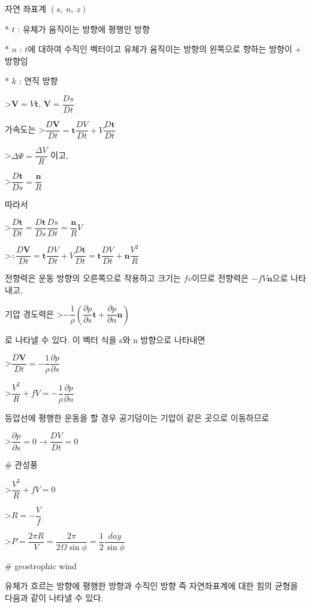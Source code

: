 자연 좌표계 $ (s,~n,~z)$ 

* $ t $ : 유체가 움직이는 방향에 평행인 방향

* $ n $ : $ t $에 대하여 수직인 벡터이고 유체가 움직이는 방향의 왼쪽으로 향하는 방향이 + 방향임

* $ k $ : 연직 방향

>$\mathbf{V} = V \mathbf{t}$, $\mathbf{V} = \dfrac{Ds}{Dt}$

가속도는
>$ \dfrac{D\mathbf{V}}{Dt} = \mathbf{t} \dfrac{DV}{Dt} + V \dfrac{D \mathbf{t}}{Dt}$

>$ \Delta \Psi = \dfrac{\Delta V}{R}$ 이고, 

>$ \dfrac{D \mathbf{t}}{Ds} = \dfrac{\mathbf{n}}{R}$

따라서

>$ \dfrac{D \mathbf{t}}{Dt} = \dfrac{D \mathbf{t}}{Ds} \dfrac{Ds}{Dt} = \dfrac{\mathbf{n}}{R} V$

>$ \therefore \dfrac{D \mathbf{V}}{Dt} = \mathbf{t} \dfrac{DV}{Dt} + V \dfrac{D\mathbf{t}}{Dt} = \mathbf{t} \dfrac{DV}{Dt} + \mathbf{n} \dfrac{V^{2}}{R} $

전향력은 운동 방향의 오른쪽으로 작용하고 크기는 $fv$이므로 전향력은 $-f V \mathbf{n}$으로 나타내고, 

기압 경도력은 
>$ - \dfrac{1}{\rho} \left( \dfrac{\partial p}{\partial s} \mathbf{t} + \dfrac{\partial p}{\partial n} \mathbf{n} \right)$

로 나타낼 수 있다. 이 벡터 식을 s와 n 방향으로 나타내면

>$ \dfrac{D\mathbf{V}}{Dt} = - \dfrac{1}{\rho} \dfrac{\partial p}{\partial s}$

>$  \dfrac{V^{2}}{R} + fV = - \dfrac{1}{\rho} \dfrac{\partial p}{\partial n}$

등압선에 평행한 운동을 할 경우 공기덩이는 기압이 같은 곳으로 이동하므로

>$ \dfrac{\partial p}{\partial s} = 0 \rightarrow  \dfrac{DV}{Dt} = 0$





# 관성풍

>$  \dfrac{V^{2}}{R} + fV = 0$

>$ R = - \dfrac{V}{f} $

>$ P = \dfrac{2 \pi R}{V} =  \dfrac{2 \pi }{2 \Omega \sin \phi} =  \dfrac{1}{2}  \dfrac{day}{\sin \phi}$


# geostrophic wind

유체가 흐르는 방향에 평행한 방향과 수직인 방향 즉 자연좌표계에 대한 힘의 균형을 다음과 같이 나타낼 수 있다.

